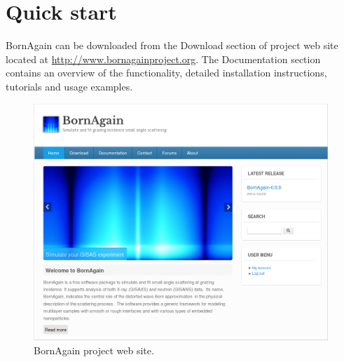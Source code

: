 

\newpage
\chapter{Quick start} 

BornAgain can be downloaded from the {\sc Download} section of project web site located at \url{http://www.bornagainproject.org}. The {\sc Documentation} section contains an overview of
the functionality, detailed installation instructions, tutorials and usage examples.

\begin{figure}[ht]
\begin{center}
\includegraphics[width=0.99\textwidth]{Figures/screenshot/website.png}
\end{center}
\caption{BornAgain project web site.}
\label{fig:website}
\end{figure}


